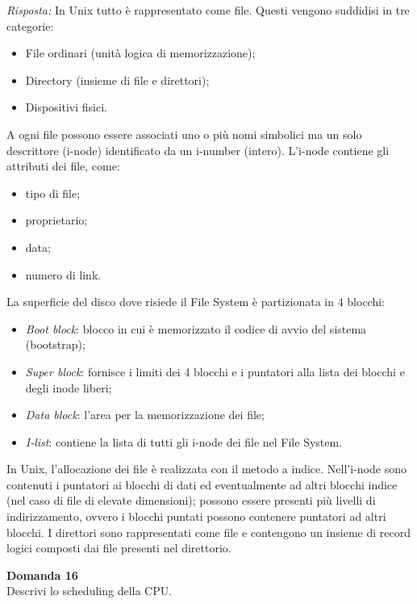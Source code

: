 \documentclass{article}
\newenvironment{problem}[2][Domanda]
    { \begin{mdframed}[backgroundcolor=gray!20] \textbf{#1 #2} \\}
    {  \end{mdframed}}
\newenvironment{solution}
    {\textit{Risposta:}}
    {}
\begin{document}
\begin{solution}
In Unix tutto è rappresentato come file.
\newline
Questi vengono suddidisi in tre categorie: 
\begin{itemize}
    \item File ordinari (unità logica di memorizzazione);
    \item Directory (insieme di file e direttori);
    \item Dispositivi fisici.
\end{itemize}
A ogni file possono essere associati uno o più nomi simbolici ma un solo descrittore (i-node) identificato da un i-number (intero).
\newline
L’i-node contiene gli attributi dei file, come:
\begin{itemize}
    \item tipo di file;
    \item proprietario;
    \item data;
    \item numero di link.
\end{itemize}
La superficie del disco dove risiede il File System è partizionata in 4 blocchi:
\begin{itemize}
    \item \emph{Boot block}: blocco in cui è memorizzato il codice di avvio del sistema (bootstrap);
    \item \emph{Super block}: fornisce i limiti dei 4 blocchi e i puntatori alla lista dei blocchi e degli inode liberi;
    \item \emph{Data block}: l’area per la memorizzazione dei file;
    \item \emph{I-list}: contiene la lista di tutti gli i-node dei file nel File System. 
\end{itemize}
In Unix, l’allocazione dei file è realizzata con il metodo a indice.
\newline
Nell’i-node sono contenuti i puntatori ai blocchi di dati ed eventualmente ad altri blocchi indice (nel caso di file di elevate dimensioni); possono essere presenti più livelli di indirizzamento, ovvero i blocchi puntati possono contenere puntatori ad altri blocchi.
\newline
I direttori sono rappresentati come file e contengono un insieme di record logici composti dai file presenti nel direttorio.
\end{solution}
\begin{problem}{16}
Descrivi lo scheduling della CPU.
\end{problem}
\end{document}
